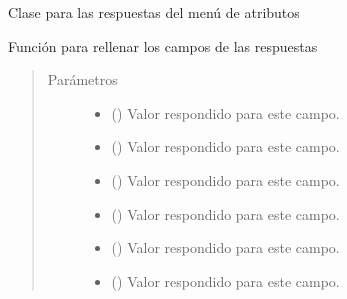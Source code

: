 \documentclass[letterpaper,10pt,spanish]{sphinxmanual}
\begin{document}
\begin{fulllineitems}
\label{\detokenize{Funciones:Funciones.Respuestas}}
\sphinxAtStartPar
Clase para las respuestas del menú de atributos

\begin{fulllineitems}
\label{\detokenize{Funciones:Funciones.Respuestas.rellenar}}
\sphinxAtStartPar
Función para rellenar los campos de las respuestas
\begin{quote}\begin{description}
\item[{Parámetros}] \leavevmode\begin{itemize}
\item {} 
\sphinxAtStartPar
{} () \textendash{} Valor respondido para este campo.

\item {} 
\sphinxAtStartPar
{} () \textendash{} Valor respondido para este campo.

\item {} 
\sphinxAtStartPar
{} () \textendash{} Valor respondido para este campo.

\item {} 
\sphinxAtStartPar
{} () \textendash{} Valor respondido para este campo.

\item {} 
\sphinxAtStartPar
{} () \textendash{} Valor respondido para este campo.

\item {} 
\sphinxAtStartPar
{} () \textendash{} Valor respondido para este campo.


\end{itemize}
\end{description}
\end{quote}
\end{fulllineitems}
\end{fulllineitems}
\end{document}

